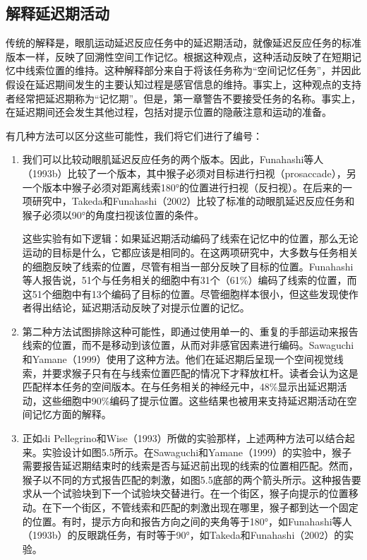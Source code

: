 \subsection{解释延迟期活动}
传统的解释是，眼肌运动延迟反应任务中的延迟期活动，就像延迟反应任务的标准版本一样，反映了回溯性空间工作记忆。根据这种观点，这种活动反映了在短期记忆中线索位置的维持。这种解释部分来自于将该任务称为“空间记忆任务”，并因此假设在延迟期间发生的主要认知过程是感官信息的维持。事实上，这种观点的支持者经常把延迟期称为“记忆期”。但是，第一章警告不要接受任务的名称。事实上，在延迟期间还会发生其他过程，包括对提示位置的隐蔽注意和运动的准备。

有几种方法可以区分这些可能性，我们将它们进行了编号：

\begin{enumerate}
	\item 我们可以比较动眼肌延迟反应任务的两个版本。因此，Funahashi等人（1993b）比较了一个版本，其中猴子必须对目标进行扫视（prosaccade），另一个版本中猴子必须对距离线索180°的位置进行扫视（反扫视）。在后来的一项研究中，Takeda和Funahashi（2002）比较了标准的动眼肌延迟反应任务和猴子必须以90°的角度扫视该位置的条件。
	
	这些实验有如下逻辑：如果延迟期活动编码了线索在记忆中的位置，那么无论运动的目标是什么，它都应该是相同的。在这两项研究中，大多数与任务相关的细胞反映了线索的位置，尽管有相当一部分反映了目标的位置。Funahashi等人报告说，51个与任务相关的细胞中有31个（61\%）编码了线索的位置，而这51个细胞中有13个编码了目标的位置。尽管细胞样本很小，但这些发现使作者得出结论，延迟期活动反映了对提示位置的记忆。
	\item 第二种方法试图排除这种可能性，即通过使用单一的、重复的手部运动来报告线索的位置，而不是移动到该位置，从而对非感官因素进行编码。Sawaguchi和Yamane（1999）使用了这种方法。他们在延迟期后呈现一个空间视觉线索，并要求猴子只有在与线索位置匹配的情况下才释放杠杆。读者会认为这是匹配样本任务的空间版本。在与任务相关的神经元中，48\%显示出延迟期活动，这些细胞中90\%编码了提示位置。这些结果也被用来支持延迟期活动在空间记忆方面的解释。
	\item 正如di Pellegrino和Wise（1993）所做的实验那样，上述两种方法可以结合起来。实验设计如图5.5所示。在Sawaguchi和Yamane（1999）的实验中，猴子需要报告延迟期结束时的线索是否与延迟前出现的线索的位置相匹配。然而，猴子以不同的方式报告匹配的刺激，如图5.5底部的两个箭头所示。这种报告要求从一个试验块到下一个试验块交替进行。在一个街区，猴子向提示的位置移动。在下一个街区，不管线索和匹配的刺激出现在哪里，猴子都到达一个固定的位置。有时，提示方向和报告方向之间的夹角等于180°，如Funahashi等人（1993b）的反眼跳任务，有时等于90°，如Takeda和Funahashi（2002）的实验。
	

\end{enumerate}
